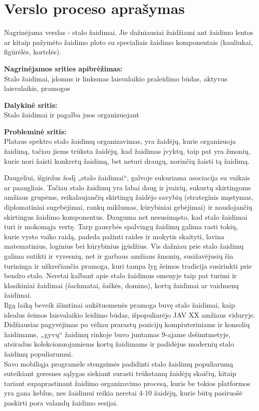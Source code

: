 \documentclass{VUMIFPSkursinis}
\begin{document}
\section{Verslo proceso aprašymas}
Nagrinėjama verslas - stalo žaidimai. Jie dažniausiai žaidžiami ant žaidimo 
lentos ar kitaip pažymėto žaidimo ploto su specialiais žaidimo komponentais 
(kauliukai, figūrėlės, kortelės).

\textbf{Nagrinėjamos srities apibrėžimas:}\\
Stalo žaidimai, įdomus ir linksmas laisvalaikio praleidimo būdas, aktyvus 
laisvalaikis, pramogos

\textbf{Dalykinė sritis:}\\
Stalo žaidimai ir pagalba juos organizuojant

\textbf{Probleminė sritis:}\\
Plataus spektro stalo žaidimų organizavimas, yra žaidėjų, kurie organizuoja 
žaidimą, tačiau jiems trūksta žaidėjų, kad žaidimas įvyktų, taip pat yra žmonių, 
kurie nori žaisti konkretų žaidimą, bet neturi draugų, norinčių žaisti tą žaidimą.

Daugeliui, išgirdus žodį „stalo žaidimai“, galvoje sukuriama asociacija 
su vaikais ar paaugliais. Tačiau stalo žaidimų yra labai daug ir įvairių, 
sukurtų skirtingoms amžiaus grupėms, reikalaujančių skirtingų žaidėjo savybių 
(strateginis mąstymas, diplomatiniai sugebėjimai, rankų miklumas, kūrybiniai 
gebėjimai) ir naudojančių skirtingus žaidimo komponentus. Dauguma net nesusimąsto, 
kad stalo žaidimai turi ir mokomąja vertę. Tarp gausybės spalvingų žaidimų galima 
rasti tokių, kurie vysto vaiko raidą, padeda pažinti raides ir mokytis skaityti, 
lavina matematinius, loginius bei kūrybinius įgūdžius. Vis dažniau prie stalo 
žaidimų galima sutikti ir vyresnių, net ir garbaus amžiaus žmonių, susižavėjusių 
šia turininga ir užkrečiančia pramoga, kuri tampa lyg šeimos tradicija susirinkti 
prie bendro stalo. Neretai kalbant apie stalo žaidimus omenyje taip pat turimi ir 
klasikiniai žaidimai (šachmatai, šaškės, domino), kortų žaidimai ar vaidmenų žaidimai.\\
Ilgą laiką beveik išimtinai aukštuomenės pramoga buvę stalo žaidimai, kaip idealus 
šeimos laisvalaikio leidimo būdas, išpopuliarėjo JAV XX amžiaus viduryje. 
Didžiausias pagyvėjimas po vėliau prarastų pozicijų kompiuteriniams ir konsolių 
žaidimams, „gyvų“ žaidimų rinkoje buvo juntamas 9-ajame dešimtmetyje, atsiradus 
kolekcionuojamiems kortų žaidimams ir padidėjus modernių stalo žaidimų populiarumui.\\
Savo mobiliąja programėle stengsimės padidinti stalo žaidimų populiarumą suteikiant 
geresnes sąlygas siekiant surasti trūkstamų žaidėjų skaičių, kitaip tariant 
supaprastinant žaidimo organizavimo procesą, kuris be tokios platformos yra gana 
keblus, nes žaidimui reikia neretai 4-10 žaidėjų, kurie būtų pasiruošė paskirti 
pora valandų žaidimo sesijai.
\end{document}
